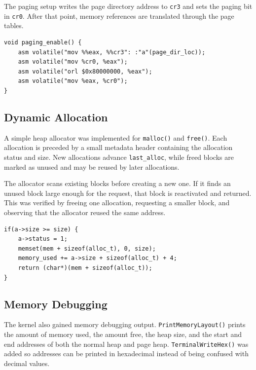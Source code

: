 The paging setup writes the page directory address to \texttt{cr3} and sets the paging bit in \texttt{cr0}. After that point, memory references are translated through the page tables.

\begin{listing}[H]
\begin{verbatim}
void paging_enable() {
    asm volatile("mov %%eax, %%cr3": :"a"(page_dir_loc));
    asm volatile("mov %cr0, %eax");
    asm volatile("orl $0x80000000, %eax");
    asm volatile("mov %eax, %cr0");
}
\end{verbatim}
\caption{Enabling paging by loading \texttt{cr3} and setting the paging bit in \texttt{cr0}.}
\end{listing}

\subsection{Dynamic Allocation}
A simple heap allocator was implemented for \texttt{malloc()} and \texttt{free()}. Each allocation is preceded by a small metadata header containing the allocation status and size. New allocations advance \texttt{last\_alloc}, while freed blocks are marked as unused and may be reused by later allocations.

The allocator scans existing blocks before creating a new one. If it finds an unused block large enough for the request, that block is reactivated and returned. This was verified by freeing one allocation, requesting a smaller block, and observing that the allocator reused the same address.

\begin{listing}[H]
\begin{verbatim}
if(a->size >= size) {
    a->status = 1;
    memset(mem + sizeof(alloc_t), 0, size);
    memory_used += a->size + sizeof(alloc_t) + 4;
    return (char*)(mem + sizeof(alloc_t));
}
\end{verbatim}
\caption{Reusing a freed heap block when it is large enough for a new allocation.}
\end{listing}

\subsection{Memory Debugging}
The kernel also gained memory debugging output. \texttt{PrintMemoryLayout()} prints the amount of memory used, the amount free, the heap size, and the start and end addresses of both the normal heap and page heap. \texttt{TerminalWriteHex()} was added so addresses can be printed in hexadecimal instead of being confused with decimal values.
\clearpage

